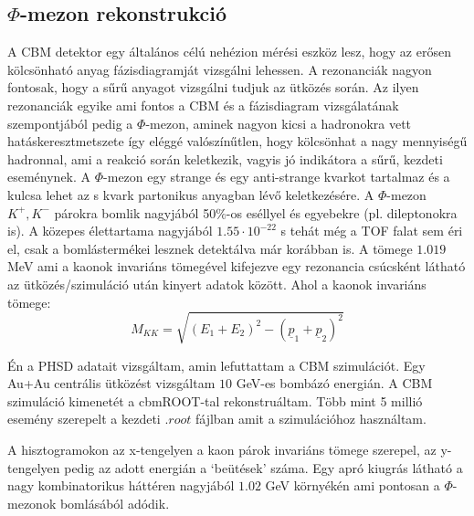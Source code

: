 \documentclass[a4paper,12pt]{article}
\begin{document}
\subsection{ $\Phi$-mezon rekonstrukció}
\vspace{5mm}
\par A CBM detektor egy általános célú nehézion mérési eszköz lesz, hogy az erősen kölcsönható anyag fázisdiagramját vizsgálni lehessen. A
rezonanciák nagyon fontosak, hogy a sűrű anyagot vizsgálni tudjuk az ütközés során. Az ilyen rezonanciák egyike ami fontos a CBM és a 
fázisdiagram vizsgálatának szempontjából pedig a $\Phi$-mezon, aminek nagyon kicsi a hadronokra vett hatáskeresztmetszete így eléggé 
valószínűtlen, hogy kölcsönhat a nagy mennyiségű hadronnal, ami a reakció során keletkezik, vagyis jó indikátora a sűrű, kezdeti eseménynek.
A $\Phi$-mezon egy strange és egy anti-strange kvarkot tartalmaz és a kulcsa lehet az s kvark partonikus anyagban lévő keletkezésére. A
$\Phi$-mezon $K^{+}, K^{-}$ párokra bomlik nagyjából 50$\%$-os eséllyel és egyebekre (pl. dileptonokra is). A közepes élettartama nagyjából $1.55\cdot10^{-22}$ s
 tehát még a TOF falat sem éri el, csak a bomlástermékei lesznek detektálva már korábban is. 
A tömege $1.019$ MeV ami a kaonok invariáns tömegével kifejezve egy rezonancia csúcsként látható az ütközés/szimuláció után kinyert 
adatok között. Ahol a kaonok invariáns tömege:
\begin{equation*}
M_{KK} = \sqrt{(E_{1}+E_{2})^{2} - (\underline{p}_{1} + \underline{p}_{2})^{2}}
\end{equation*}
\vspace{5mm}
\par Én a PHSD adatait vizsgáltam, amin lefuttattam a CBM szimulációt. Egy Au+Au centrális ütközést vizsgáltam $10$ GeV-es bombázó energián. 
A CBM szimuláció kimenetét a cbmROOT-tal rekonstruáltam. Több mint 5 millió esemény szerepelt a kezdeti $.root$ fájlban amit a szimulációhoz 
használtam.
\vspace{5mm}
\par A hisztogramokon az x-tengelyen a kaon párok invariáns tömege szerepel, az y-tengelyen pedig az adott energián a `beütések' száma. Egy 
apró kiugrás látható a nagy kombinatorikus háttéren nagyjából $1.02$ GeV környékén ami pontosan a $\Phi$-mezonok bomlásából adódik.
\end{document}
